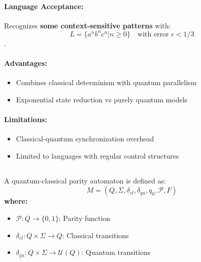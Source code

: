 \paragraph{Language Acceptance:}
Recognizes \textbf{some context-sensitive patterns} with:
\[ L = \{a^nb^nc^n | n \geq 0\} \quad \text{with error } \epsilon < 1/3 \]\cite{zheng2012two, gruska2005}.

\paragraph{Advantages:}
\begin{itemize}
    \item Combines classical determinism with quantum parallelism
    \item Exponential state reduction vs purely quantum models
\end{itemize}

\paragraph{Limitations:}
\begin{itemize}
    \item Classical-quantum synchronization overhead
    \item Limited to languages with regular control structures
\end{itemize}

\subsection{}
\label{subsec:qcpa}

\begin{definition}
A quantum-classical parity automaton is defined as:
\[
M = (Q, \Sigma, \delta_{cl}, \delta_{qu}, q_0, \mathcal{P}, F)
\]
\textbf{where:}
\begin{itemize}
    \item $\mathcal{P}: Q \rightarrow \{0,1\}$: Parity function
    \item $\delta_{cl}: Q \times \Sigma \rightarrow Q$: Classical transitions
    \item $\delta_{qu}: Q \times \Sigma \rightarrow \mathcal{U}(Q)$: Quantum transitions
\end{itemize}
\end{definition}

